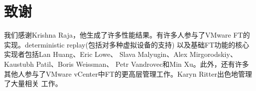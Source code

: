 \section*{致谢}

我们感谢Krishna Raja，他生成了许多性能结果。有许多人参与了VMware %
FT的实现。deterministic replay(包括对多种虚拟设备的支持)%
以及基础FT功能的核心实现者包括Lan Huang、Eric Lowe、%
Slava Malyugin、Alex Mirgorodskiy、%
Kaustubh Patil、Boris Weissman、%
Petr Vandrovec和Min Xu。此外，还有许多其他人参与了VMware %
vCenter中FT的更高层管理工作。Karyn Ritter出色地管理了大量相关%
工作。
